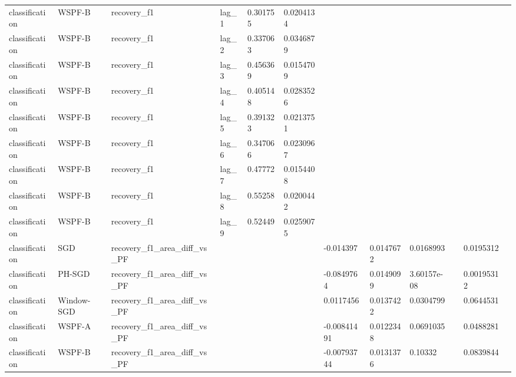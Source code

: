\begin{tabular}{llllllllllll}
classification & WSPF-B & recovery\_f1 & lag\_1 & 0.301755 & 0.0204134 &  &  &  &  &  &  \\
classification & WSPF-B & recovery\_f1 & lag\_2 & 0.337063 & 0.0346879 &  &  &  &  &  &  \\
classification & WSPF-B & recovery\_f1 & lag\_3 & 0.456369 & 0.0154709 &  &  &  &  &  &  \\
classification & WSPF-B & recovery\_f1 & lag\_4 & 0.405148 & 0.0283526 &  &  &  &  &  &  \\
classification & WSPF-B & recovery\_f1 & lag\_5 & 0.391323 & 0.0213751 &  &  &  &  &  &  \\
classification & WSPF-B & recovery\_f1 & lag\_6 & 0.347066 & 0.0230967 &  &  &  &  &  &  \\
classification & WSPF-B & recovery\_f1 & lag\_7 & 0.47772 & 0.0154408 &  &  &  &  &  &  \\
classification & WSPF-B & recovery\_f1 & lag\_8 & 0.55258 & 0.0200442 &  &  &  &  &  &  \\
classification & WSPF-B & recovery\_f1 & lag\_9 & 0.52449 & 0.0259075 &  &  &  &  &  &  \\
classification & SGD & recovery\_f1\_area\_diff\_vs\_PF &  &  &  & -0.014397 & 0.0147672 & 0.0168993 &  & 0.0195312 &  \\
classification & PH-SGD & recovery\_f1\_area\_diff\_vs\_PF &  &  &  & -0.0849764 & 0.0149099 & 3.60157e-08 &  & 0.00195312 &  \\
classification & Window-SGD & recovery\_f1\_area\_diff\_vs\_PF &  &  &  & 0.0117456 & 0.0137422 & 0.0304799 &  & 0.0644531 &  \\
classification & WSPF-A & recovery\_f1\_area\_diff\_vs\_PF &  &  &  & -0.00841491 & 0.0122348 & 0.0691035 &  & 0.0488281 &  \\
classification & WSPF-B & recovery\_f1\_area\_diff\_vs\_PF &  &  &  & -0.00793744 & 0.0131376 & 0.10332 &  & 0.0839844 &  \\
\hline
\end{tabular}

